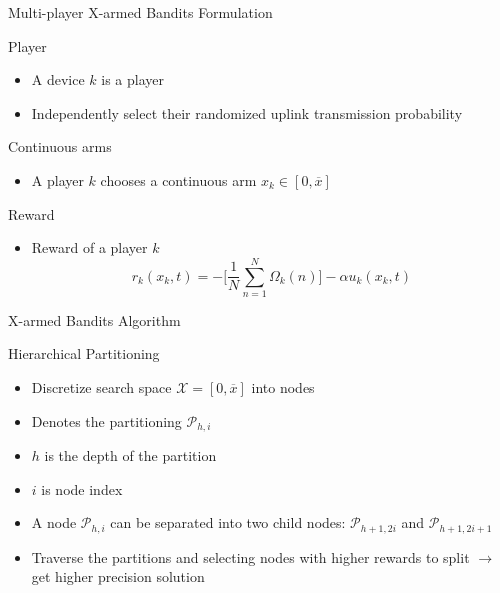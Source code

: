 \documentclass[9pt]{beamer}
\begin{document}
\begin{frame}{Multi-player X-armed Bandits Formulation}
    \begin{block}{Player}
        \begin{itemize}
            \item A device $k$ is a player
            \item Independently select their randomized uplink transmission probability
        \end{itemize}
    \end{block}
    \begin{block}{Continuous arms}
        \begin{itemize}
            \item A player $k$ chooses a continuous arm $x_k \in [0, \overline{x}]$
        \end{itemize}
    \end{block}
    \begin{block}{Reward}
        \begin{itemize}
            \item Reward of a player $k$
                \begin{equation}
                    r_k(x_k, t) = - \Big[ \frac{1}{N} \sum_{n=1}^{N} \Omega_k(n) \Big] - \alpha u_k(x_k, t)
                \end{equation}
        \end{itemize}
    \end{block}
\end{frame}

\begin{frame}{X-armed Bandits Algorithm}
    \begin{block}{Hierarchical Partitioning}
        \begin{itemize}
            \item Discretize search space $\mathcal{X} = [0, \overline{x}]$ into nodes
            \item Denotes the partitioning $\mathcal{P}_{h, i}$
            \item $h$ is the depth of the partition
            \item $i$ is node index
            \item A node $\mathcal{P}_{h, i}$ can be separated into two child nodes: $\mathcal{P}_{h+1, 2i}$ and $\mathcal{P}_{h+1, 2i+1}$
            \item Traverse the partitions and selecting nodes with higher rewards to split $\rightarrow$ get higher precision solution
        \end{itemize}
    \end{block}
\end{frame}
\end{document}
